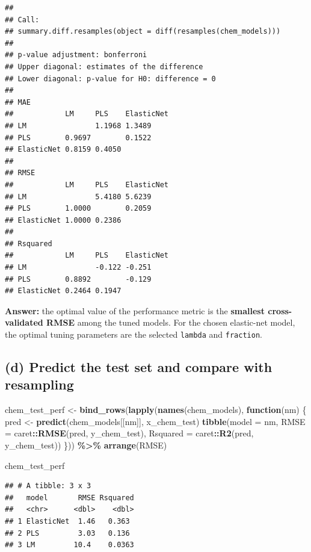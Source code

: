 \documentclass[
  11pt,
]{article}
\newenvironment{Shaded}{\begin{snugshade}}{\end{snugshade}}
\newcommand{\AttributeTok}[1]{\textcolor[rgb]{0.13,0.29,0.53}{#1}}
\newcommand{\ControlFlowTok}[1]{\textcolor[rgb]{0.13,0.29,0.53}{\textbf{#1}}}
\newcommand{\FunctionTok}[1]{\textcolor[rgb]{0.13,0.29,0.53}{\textbf{#1}}}
\newcommand{\NormalTok}[1]{#1}
\newcommand{\OtherTok}[1]{\textcolor[rgb]{0.56,0.35,0.01}{#1}}
\newcommand{\SpecialCharTok}[1]{\textcolor[rgb]{0.81,0.36,0.00}{\textbf{#1}}}
\begin{document}
\begin{verbatim}
## 
## Call:
## summary.diff.resamples(object = diff(resamples(chem_models)))
## 
## p-value adjustment: bonferroni 
## Upper diagonal: estimates of the difference
## Lower diagonal: p-value for H0: difference = 0
## 
## MAE 
##            LM     PLS    ElasticNet
## LM                1.1968 1.3489    
## PLS        0.9697        0.1522    
## ElasticNet 0.8159 0.4050           
## 
## RMSE 
##            LM     PLS    ElasticNet
## LM                5.4180 5.6239    
## PLS        1.0000        0.2059    
## ElasticNet 1.0000 0.2386           
## 
## Rsquared 
##            LM     PLS    ElasticNet
## LM                -0.122 -0.251    
## PLS        0.8892        -0.129    
## ElasticNet 0.2464 0.1947
\end{verbatim}

\textbf{Answer:} the optimal value of the performance metric is the
\textbf{smallest cross-validated RMSE} among the tuned models. For the
chosen elastic-net model, the optimal tuning parameters are the selected
\texttt{lambda} and \texttt{fraction}.

\subsection{(d) Predict the test set and compare with
resampling}\label{d-predict-the-test-set-and-compare-with-resampling}

\begin{Shaded}
\begin{Highlighting}[]
\NormalTok{chem\_test\_perf }\OtherTok{\textless{}{-}} \FunctionTok{bind\_rows}\NormalTok{(}\FunctionTok{lapply}\NormalTok{(}\FunctionTok{names}\NormalTok{(chem\_models), }\ControlFlowTok{function}\NormalTok{(nm) \{}
\NormalTok{  pred }\OtherTok{\textless{}{-}} \FunctionTok{predict}\NormalTok{(chem\_models[[nm]], x\_chem\_test)}
  \FunctionTok{tibble}\NormalTok{(}\AttributeTok{model =}\NormalTok{ nm,}
         \AttributeTok{RMSE =}\NormalTok{ caret}\SpecialCharTok{::}\FunctionTok{RMSE}\NormalTok{(pred, y\_chem\_test),}
         \AttributeTok{Rsquared =}\NormalTok{ caret}\SpecialCharTok{::}\FunctionTok{R2}\NormalTok{(pred, y\_chem\_test))}
\NormalTok{\})) }\SpecialCharTok{\%\textgreater{}\%} \FunctionTok{arrange}\NormalTok{(RMSE)}

\NormalTok{chem\_test\_perf}
\end{Highlighting}
\end{Shaded}

\begin{verbatim}
## # A tibble: 3 x 3
##   model       RMSE Rsquared
##   <chr>      <dbl>    <dbl>
## 1 ElasticNet  1.46   0.363 
## 2 PLS         3.03   0.136 
## 3 LM         10.4    0.0363
\end{verbatim}
\end{document}
